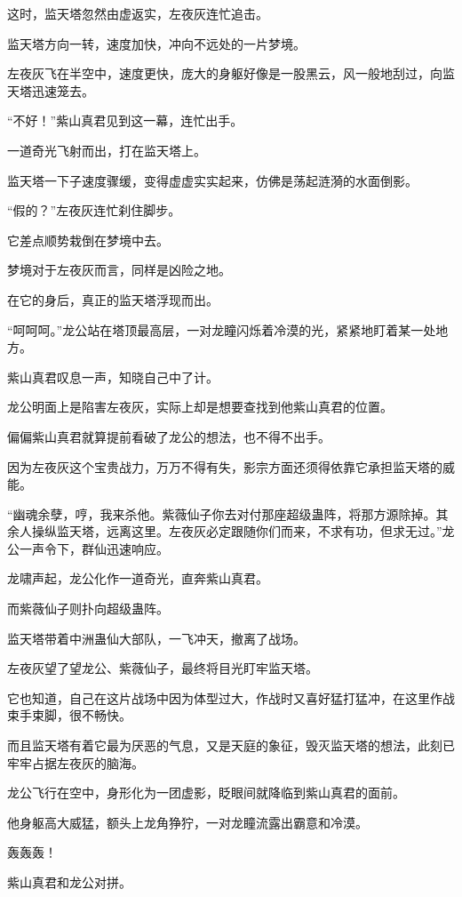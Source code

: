 \begin{this_body}
这时，监天塔忽然由虚返实，左夜灰连忙追击。

监天塔方向一转，速度加快，冲向不远处的一片梦境。

左夜灰飞在半空中，速度更快，庞大的身躯好像是一股黑云，风一般地刮过，向监天塔迅速笼去。

“不好！”紫山真君见到这一幕，连忙出手。

一道奇光飞射而出，打在监天塔上。

监天塔一下子速度骤缓，变得虚虚实实起来，仿佛是荡起涟漪的水面倒影。

“假的？”左夜灰连忙刹住脚步。

它差点顺势栽倒在梦境中去。

梦境对于左夜灰而言，同样是凶险之地。

在它的身后，真正的监天塔浮现而出。

“呵呵呵。”龙公站在塔顶最高层，一对龙瞳闪烁着冷漠的光，紧紧地盯着某一处地方。

紫山真君叹息一声，知晓自己中了计。

龙公明面上是陷害左夜灰，实际上却是想要查找到他紫山真君的位置。

偏偏紫山真君就算提前看破了龙公的想法，也不得不出手。

因为左夜灰这个宝贵战力，万万不得有失，影宗方面还须得依靠它承担监天塔的威能。

“幽魂余孽，哼，我来杀他。紫薇仙子你去对付那座超级蛊阵，将那方源除掉。其余人操纵监天塔，远离这里。左夜灰必定跟随你们而来，不求有功，但求无过。”龙公一声令下，群仙迅速响应。

龙啸声起，龙公化作一道奇光，直奔紫山真君。

而紫薇仙子则扑向超级蛊阵。

监天塔带着中洲蛊仙大部队，一飞冲天，撤离了战场。

左夜灰望了望龙公、紫薇仙子，最终将目光盯牢监天塔。

它也知道，自己在这片战场中因为体型过大，作战时又喜好猛打猛冲，在这里作战束手束脚，很不畅快。

而且监天塔有着它最为厌恶的气息，又是天庭的象征，毁灭监天塔的想法，此刻已牢牢占据左夜灰的脑海。

龙公飞行在空中，身形化为一团虚影，眨眼间就降临到紫山真君的面前。

他身躯高大威猛，额头上龙角狰狞，一对龙瞳流露出霸意和冷漠。

轰轰轰！

紫山真君和龙公对拼。


\end{this_body}
